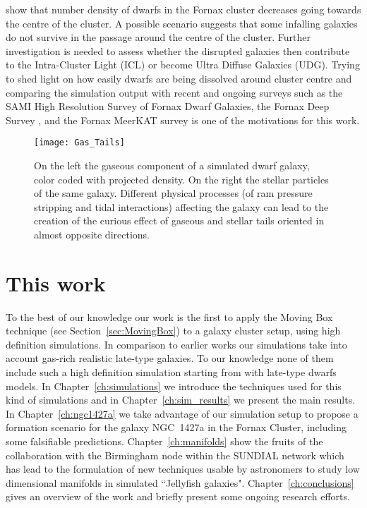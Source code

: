 \citet{Venhola2018} show that number density of dwarfs in the Fornax cluster decreases going towards the centre of the cluster.
A possible scenario suggests that some infalling galaxies do not survive in the passage around the centre of the cluster.
Further investigation is needed to assess  whether the disrupted galaxies then contribute to the Intra-Cluster Light (ICL) or become Ultra Diffuse Galaxies (UDG).
Trying to shed light on how easily dwarfs are being dissolved around cluster centre and comparing the simulation output with recent and ongoing surveys such as the SAMI High Resolution Survey of Fornax Dwarf Galaxies, \citep{Owers2019, Scott2018}
the Fornax Deep Survey \citep{Venhola2018}, and the Fornax MeerKAT survey \citep{Loni2021} is one of the motivations for this work.



\begin{figure}
  \centering
  \texttt{[image: Gas\_Tails]}
  \caption{On the left the gaseous component of a simulated dwarf galaxy, color coded with projected density.
    On the right the stellar particles of the same galaxy.
   Different physical processes (of ram pressure stripping and tidal interactions) affecting the galaxy can lead to the creation of the curious effect of gaseous and stellar tails oriented in almost opposite directions.}
  \label{fig:tails}
\end{figure}


\section{This work}
To the best of our knowledge our work is the first to apply the Moving Box technique (see Section~\ref{sec:MovingBox}) to a galaxy cluster setup, using high definition simulations.
In comparison to earlier works our simulations take into account gas-rich realistic late-type galaxies.
To our knowledge none of them include such a high definition simulation starting from with late-type dwarfs models.
In Chapter~\ref{ch:simulations} we introduce the techniques used for this kind of simulations and in Chapter~\ref{ch:sim_results} we present the main results.
In Chapter~\ref{ch:ngc1427a} \citep{Mastropietro2021} we take advantage of our simulation setup to propose a formation scenario for the galaxy NGC~1427a in the Fornax Cluster, including some falsifiable predictions.
Chapter~\ref{ch:manifolds} show the fruits of the collaboration with the Birmingham node within the SUNDIAL network which has lead to the formulation of new techniques usable by astronomers to study low dimensional manifolds in simulated ``Jellyfish galaxies".
Chapter~\ref{ch:conclusions} gives an overview of the work and briefly present some ongoing research efforts.


